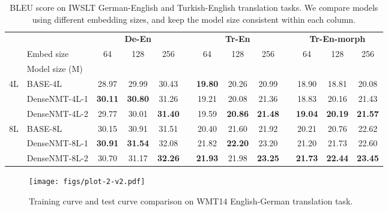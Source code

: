 \documentclass[11pt,a4paper]{article}
\begin{document}
\begin{table*}[t]
\centering
\small
\captionsetup{font=small}
\begin{tabular}{llccccccccccc}
\toprule
& & \multicolumn{3}{c}{\textbf{De-En}}  &  & \multicolumn{3}{c}{\textbf{Tr-En} } & & \multicolumn{3}{c}{\textbf{Tr-En-morph}} \\
 \cmidrule{3-5}  \cmidrule{7-9} \cmidrule{11-13}
&Embed size & 64 & 128 & 256 & & 64 & 128 & 256 & & 64 & 128 & 256 \\
&Model size (M) &  &  &  &&  & &  && & & \\
\midrule
\multirow{ 3}{*}{4L}&BASE-4L & 28.97 & 29.99 & 30.43 && \textbf{19.80}  &20.26 & 20.99 && 18.90  & 18.81 & 20.08  \\
&DenseNMT-4L-1 & \textbf{30.11} & \textbf{30.80} &31.26 &&19.21 &20.08 & 21.36 &&18.83 & 20.16 & 21.43\\
&DenseNMT-4L-2 &29.77 & 30.01 &\textbf{31.40} && 19.59 & \textbf{20.86} & \textbf{21.48} && \textbf{19.04} & \textbf{20.19} & \textbf{21.57}\\
\midrule
\multirow{ 3}{*}{8L}&BASE-8L &30.15 & 30.91  &31.51  &&20.40  &21.60   &21.92  && 20.21 &20.76   & 22.62 \\ 
&DenseNMT-8L-1 &\textbf{30.91} & \textbf{31.54}  & 32.08 && 21.82  & \textbf{22.20}  &23.20 && 21.20 & 21.73  & 22.60  \\ 
&DenseNMT-8L-2 &30.70 & 31.17  & \textbf{32.26} && \textbf{21.93} & 21.98  &\textbf{23.25}  &&\textbf{21.73} & \textbf{22.44}  & \textbf{23.45} \\ 
\bottomrule
\end{tabular}
\caption{BLEU score on IWSLT German-English and Turkish-English translation tasks. We compare models using different embedding sizes, and keep the model size consistent within each column.}
\label{tab:embed}
\end{table*}



\begin{figure}[t]
\centering 
\captionsetup{font=small}
\texttt{[image: figs/plot-2-v2.pdf]}
\caption{Training curve and test curve comparison on WMT14 English-German translation task.}
\label{fig:curve_ende}
\end{figure}
\end{document}
